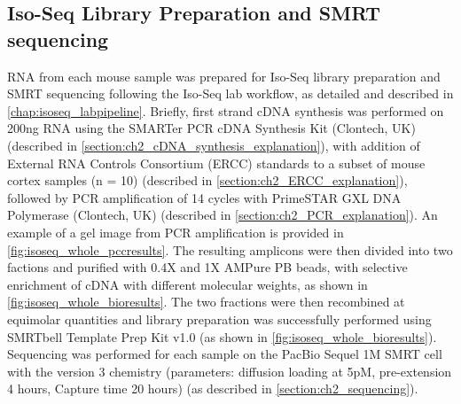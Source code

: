 \subsection{Iso-Seq Library Preparation and SMRT sequencing}
RNA from each mouse sample was prepared for Iso-Seq library preparation and SMRT sequencing following the Iso-Seq lab workflow, as detailed and described in \cref{chap:isoseq_labpipeline}. Briefly, first strand cDNA synthesis was performed on 200ng RNA using the SMARTer PCR cDNA Synthesis Kit (Clontech, UK) (described in \cref{section:ch2_cDNA_synthesis_explanation}), with addition of External RNA Controls Consortium (ERCC) standards to a subset of mouse cortex samples (n = 10) (described in \cref{section:ch2_ERCC_explanation}), followed by PCR amplification of 14 cycles with PrimeSTAR GXL DNA Polymerase (Clontech, UK) (described in \cref{section:ch2_PCR_explanation}). An example of a gel image from PCR amplification is provided in \cref{fig:isoseq_whole_pccresults}. The resulting amplicons were then divided into two factions and purified with 0.4X and 1X AMPure PB beads, with selective enrichment of cDNA with different molecular weights, as shown in \cref{fig:isoseq_whole_bioresults}. The two fractions were then recombined at equimolar quantities and library preparation was successfully performed using SMRTbell Template Prep Kit v1.0 (as shown in \cref{fig:isoseq_whole_bioresults}). Sequencing was performed for each sample on the PacBio Sequel 1M SMRT cell with the version 3 chemistry (parameters: diffusion loading at 5pM, pre-extension 4 hours, Capture time 20 hours) (as described in \cref{section:ch2_sequencing}).

